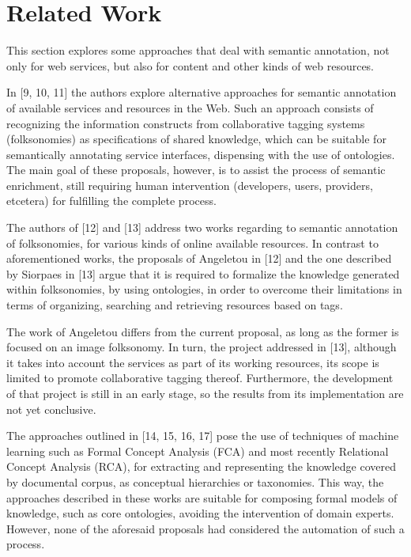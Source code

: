 \section{Related Work}

\noindent This section explores some approaches that deal with semantic annotation, not only for web services, but also for content and other kinds of web resources. 

In [9, 10, 11] the authors explore alternative approaches for semantic annotation of available services and resources in the Web. Such an approach consists of recognizing the information constructs from collaborative tagging systems (folksonomies) as specifications of shared knowledge, which can be suitable for semantically annotating service interfaces, dispensing with the use of ontologies. The main goal of these proposals, however, is to assist the process of semantic enrichment, still requiring human intervention (developers, users, providers, etcetera) for fulfilling the complete process. 

The authors of [12] and [13] address two works regarding to semantic annotation of folksonomies, for various kinds of online available resources. In contrast to aforementioned works, the proposals of Angeletou in [12] and the one described by Siorpaes in [13] argue that it is required to formalize the knowledge generated within folksonomies, by using ontologies, in order to overcome their limitations in terms of organizing, searching and retrieving resources based on tags.

The work of Angeletou differs from the current proposal, as long as the former is focused on an image folksonomy. In turn, the project addressed in [13], although it takes into account the services as part of its working resources, its scope is limited to promote collaborative tagging thereof. Furthermore, the development of that project is still in an early stage, so the results from its implementation are not yet conclusive.

The approaches outlined in [14, 15, 16, 17] pose the use of techniques of machine learning such as Formal Concept Analysis (FCA) and most recently Relational Concept Analysis (RCA), for extracting and representing the knowledge covered by documental corpus, as conceptual hierarchies or taxonomies. This way, the approaches described in these works are suitable for composing formal models of knowledge, such as core ontologies, avoiding the intervention of domain experts. However, none of the aforesaid proposals had considered the automation of such a process.

